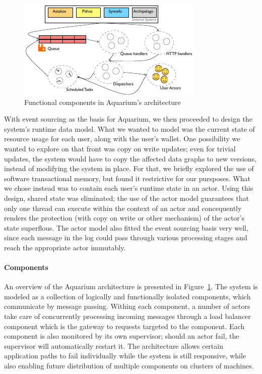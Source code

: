 \begin{figure}
    \begin{center}
    \includegraphics[scale=1.5]{arch.pdf}
    \end{center}
\caption{Functional components in Aquarium's architecture} 
\label{fig:arch}
\end{figure}

With event sourcing as the basis for Aquarium, we then proceeded to design the
system's runtime data model. What we wanted to model was the current state of
resource usage for each user, along with the user's wallet. One possibility we
wanted to explore on that front was copy on write updates; even for trivial
updates, the system would have to copy the affected data graphs to new
versions, instead of modifying the system in place. For that, we briefly
explored the use of software transactional memory, but found it restrictive for
our pursposes. What we chose instead was to contain each user's runtime state
in an actor. Using this design, shared state was eliminated; the use of the
actor model guarantees that only one thread can execute within the context of
an actor and concequently renders the protection (with copy on write or other
mechanism) of the actor's state superflous. The actor model also fitted the
event sourcing basis very well, since each message in the log could pass
through various processing stages and reach the appropriate actor immutably.

\paragraph{Components} An overview of the Aquarium architecture is presented in
Figure~\ref{fig:arch}.  The system is modeled as a collection of logically and
functionally isolated components, which communicate by message passing. Withing
each component, a number of actors take care of concurrently processing
incoming messages through a load balancer component which is the gateway to
requests targeted to the component. Each component is also monitored by its own
supervisor; should an actor fail, the supervisor will automatically restart it.
The architecture allows certain application paths to fail individually while
the system is still responsive, while also enabling future distribution of
multiple components on clusters of machines.

